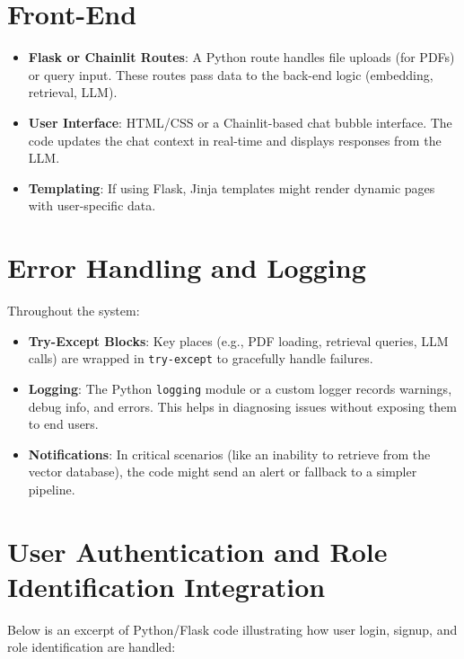 \section{Front-End }
\label{sec:frontend}
\begin{itemize}
    \item \textbf{Flask or Chainlit Routes}: A Python route handles file uploads (for PDFs) or query input. These routes pass data to the back-end logic (embedding, retrieval, LLM).
    \item \textbf{User Interface}: HTML/CSS or a Chainlit-based chat bubble interface. The code updates the chat context in real-time and displays responses from the LLM.
    \item \textbf{Templating}: If using Flask, Jinja templates might render dynamic pages with user-specific data.
\end{itemize}

\section{Error Handling and Logging}
\label{sec:error-logging}
Throughout the system:
\begin{itemize}
    \item \textbf{Try-Except Blocks}: Key places (e.g., PDF loading, retrieval queries, LLM calls) are wrapped in \texttt{try-except} to gracefully handle failures.
    \item \textbf{Logging}: The Python \texttt{logging} module or a custom logger records warnings, debug info, and errors. This helps in diagnosing issues without exposing them to end users.
    \item \textbf{Notifications}: In critical scenarios (like an inability to retrieve from the vector database), the code might send an alert or fallback to a simpler pipeline.
\end{itemize}

\section{User Authentication and Role Identification Integration}
\label{sec:auth-role}

Below is an excerpt of Python/Flask code illustrating how user login, signup, and role identification are handled:

